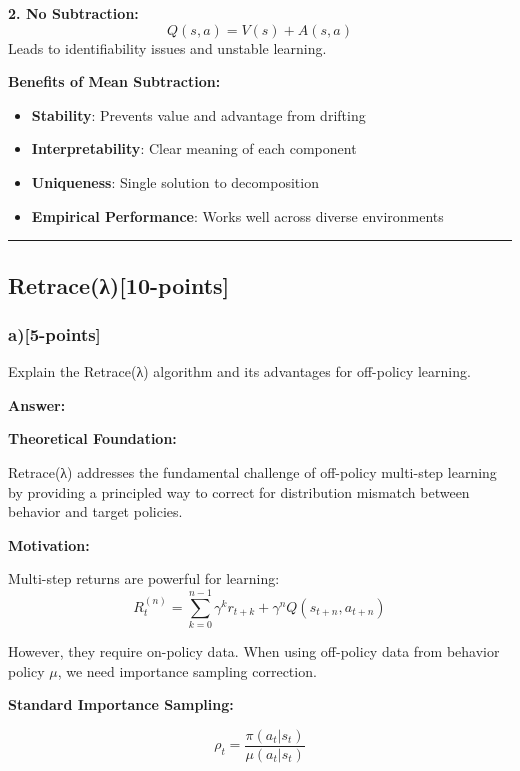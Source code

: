 \documentclass[12pt]{article}
\begin{document}
{{\textbf{2. No Subtraction:}
\begin{equation}
Q(s,a) = V(s) + A(s,a)
\end{equation}
Leads to identifiability issues and unstable learning.

\textbf{Benefits of Mean Subtraction:}
\begin{itemize}
\item \textbf{Stability}: Prevents value and advantage from drifting
\item \textbf{Interpretability}: Clear meaning of each component
\item \textbf{Uniqueness}: Single solution to decomposition
\item \textbf{Empirical Performance}: Works well across diverse environments
\end{itemize}

\noindent\rule{\textwidth}{0.2pt}

\subsection{Retrace(λ)[10-points]}
\subsubsection{a)[5-points]} Explain the Retrace(λ) algorithm and its advantages for off-policy learning.

\textbf{Answer:}

\textbf{Theoretical Foundation:}

Retrace(λ) addresses the fundamental challenge of off-policy multi-step learning by providing a principled way to correct for distribution mismatch between behavior and target policies.

\textbf{Motivation:}

Multi-step returns are powerful for learning:
\begin{equation}
R_t^{(n)} = \sum_{k=0}^{n-1} \gamma^k r_{t+k} + \gamma^n Q(s_{t+n}, a_{t+n})
\end{equation}

However, they require on-policy data. When using off-policy data from behavior policy $\mu$, we need importance sampling correction.

\textbf{Standard Importance Sampling:}

\begin{equation}
\rho_t = \frac{\pi(a_t|s_t)}{\mu(a_t|s_t)}
\end{equation}

}}
\end{document}
